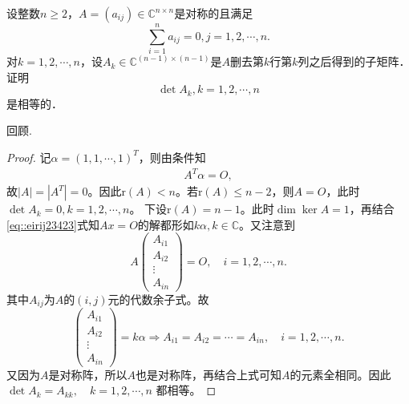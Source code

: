 \documentclass[../../main.tex]{subfiles}%
\begin{document}
\begin{example}
设整数$n \geqslant 2$，$A = (a_{ij}) \in \mathbb{C}^{n \times n}$是对称的且满足
$$\sum_{i=1}^n a_{ij} = 0, j = 1, 2, \cdots, n.$$
对$k = 1, 2, \cdots, n$，设$A_k \in \mathbb{C}^{(n-1) \times (n-1)}$是$A$删去第$k$行第$k$列之后得到的子矩阵．证明
$$\det A_k, k = 1, 2, \cdots, n$$
是相等的．
\end{example}
\begin{remark}
回顾.
\end{remark}
\begin{proof}
记$\alpha = (1,1,\cdots,1)^T$，则由条件知
\begin{align}
A^T \alpha = O, \label{eq::eirij23423}
\end{align}
故$|A| = |A^T| = 0$。因此$\text{r}(A) < n$。若$\text{r}(A) \leqslant n-2$，则$A = O$，此时
$\det A_k = 0, k = 1,2,\cdots,n$。
下设$\text{r}(A) = n-1$。此时$\dim \ker A = 1$，再结合\eqref{eq::eirij23423}式知$Ax = O$的解都形如$k\alpha, k \in \mathbb{C}$。又注意到
$$A\begin{pmatrix} A_{i1} \\ A_{i2} \\ \vdots \\ A_{in} \end{pmatrix} = O, \quad i = 1,2,\cdots,n.$$
其中$A_{ij}$为$A$的$(i,j)$元的代数余子式。故
$$\begin{pmatrix} A_{i1} \\ A_{i2} \\ \vdots \\ A_{in} \end{pmatrix} = k\alpha \Longrightarrow A_{i1} = A_{i2} = \cdots = A_{in}, \quad i = 1,2,\cdots,n.$$
又因为$A$是对称阵，所以$A$也是对称阵，再结合上式可知$A$的元素全相同。因此
$\det A_k = A_{kk}, \quad k = 1,2,\cdots,n$
都相等。
\end{proof}
\end{document}
